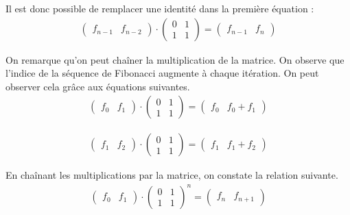 \documentclass[12pt]{article}
\begin{document}
Il est donc possible de remplacer une identité dans la première équation :
\begin{align*}
	\begin{pmatrix}
		f_{n-1} & f_{n-2}
	\end{pmatrix}
	\cdot
	\begin{pmatrix}
		0 & 1 \\
		1 & 1
	\end{pmatrix}
	=
	\begin{pmatrix}
		f_{n-1} & f_{n}
	\end{pmatrix}
\end{align*}

On remarque qu'on peut chaîner la multiplication de la matrice. On observe que l'indice de la séquence de Fibonacci augmente à chaque itération. On peut observer cela grâce aux équations suivantes.
\begin{align*}
	\begin{pmatrix}
		f_{0} & f_{1}
	\end{pmatrix}
	\cdot
	\begin{pmatrix}
		0 & 1 \\
		1 & 1
	\end{pmatrix}
	=
	\begin{pmatrix}
		f_{0} & f_{0} + f_{1}
	\end{pmatrix}
\end{align*}

\begin{align*}
	\begin{pmatrix}
		f_{1} & f_{2}
	\end{pmatrix}
	\cdot
	\begin{pmatrix}
		0 & 1 \\
		1 & 1
	\end{pmatrix}
	=
	\begin{pmatrix}
		f_{1} & f_{1} + f_{2}
	\end{pmatrix}
\end{align*}

En chaînant les multiplications par la matrice, on constate la relation suivante.
\begin{align*}
	\begin{pmatrix}
		f_{0} & f_{1}
	\end{pmatrix}
	\cdot
	\begin{pmatrix}
		0 & 1 \\
		1 & 1
	\end{pmatrix}
	^n
	=
	\begin{pmatrix}
		f_{n} & f_{n+1}
	\end{pmatrix}
\end{align*}
\end{document}
